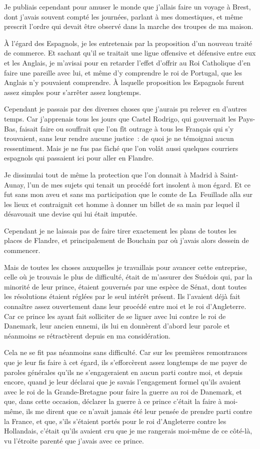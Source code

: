 \documentclass[french,twoside]{book} %
\begin{document}
Je publiais cependant pour amuser le monde que j’allais faire un voyage à Brest, dont j’avais souvent compté les journées, parlant à mes domestiques, et même prescrit l’ordre qui devait être observé dans la marche des troupes de ma maison.\par
À l’égard des Espagnols, je les entretenais par la proposition d’un nouveau traité de commerce. Et sachant qu’il se traitait une ligue offensive et défensive entre eux et les Anglais, je m’avisai pour en retarder l’effet d’offrir au Roi Catholique d’en faire une pareille avec lui, et même d’y comprendre le roi de Portugal, que les Anglais n’y pouvaient comprendre. À laquelle proposition les Espagnols furent assez simples pour s’arrêter assez longtemps.\par
Cependant je passais par des diverses choses que j’aurais pu relever en d’autres temps. Car j’apprenais tous les jours que Castel Rodrigo, qui gouvernait les Pays-Bas, faisait faire ou souffrait que l’on fît outrage à tous les Français qui s’y trouvaient, sans leur rendre aucune justice : de quoi je ne témoignai aucun ressentiment. Mais je ne fus pas fâché que l’on volât aussi quelques courriers espagnols qui passaient ici pour aller en Flandre.\par
Je dissimulai tout de même la protection que l’on donnait à Madrid à Saint-Aunay, l’un de mes sujets qui tenait un procédé fort insolent à mon égard. Et ce fut sans mon aveu et sans ma participation que le comte de La Feuillade alla sur les lieux et contraignit cet homme à donner un billet de sa main par lequel il désavouait une devise qui lui était imputée.\par
Cependant je ne laissais pas de faire tirer exactement les plans de toutes les places de Flandre, et principalement de Bouchain par où j’avais alors dessein de commencer.\par
Mais de toutes les choses auxquelles je travaillais pour avancer cette entreprise, celle où je trouvais le plus de difficulté, était de m’assurer des Suédois qui, par la minorité de leur prince, étaient gouvernés par une espèce de Sénat, dont toutes les résolutions étaient réglées par le seul intérêt présent. Ils l’avaient déjà fait connaître assez ouvertement dans leur procédé entre moi et le roi d’Angleterre. Car ce prince les ayant fait solliciter de se liguer avec lui contre le roi de Danemark, leur ancien ennemi, ils lui en donnèrent d’abord leur parole et néanmoins se rétractèrent depuis en ma considération.\par
Cela ne se fit pas néanmoins sans difficulté. Car sur les premières remontrances que je leur fis faire à cet égard, ils s’efforcèrent assez longtemps de me payer de paroles générales qu’ils ne s’engageraient en aucun parti contre moi, et depuis encore, quand je leur déclarai que je savais l’engagement formel qu’ils avaient avec le roi de la Grande-Bretagne pour faire la guerre au roi de Danemark, et que, dans cette occasion, déclarer la guerre à ce prince c’était la faire à moi-même, ils me dirent que ce n’avait jamais été leur pensée de prendre parti contre la France, et que, s’ils s’étaient portés pour le roi d’Angleterre contre les Hollandais, c’était qu’ils avaient cru que je me rangerais moi-même de ce côté-là, vu l’étroite parenté que j’avais avec ce prince.\par
\end{document}
